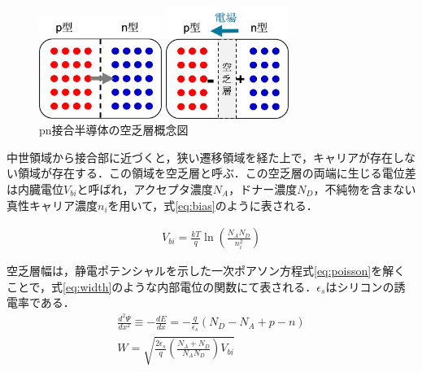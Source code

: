 \begin{figure}[h]
  \centering
  \begin{minipage}[b]{0.45\linewidth}
    \centering
    \includegraphics[width=4cm]{./figure/semiku1.png}
  \end{minipage}
  \begin{minipage}[b]{0.45\linewidth}
    \centering
    \includegraphics[width=4cm]{./figure/semiku2.png}
  \end{minipage}
  \caption{pn接合半導体の空乏層概念図}
  \label{fig:pn}
\end{figure}


中世領域から接合部に近づくと，狭い遷移領域を経た上で，キャリアが存在しない領域が存在する．この領域を空乏層と呼ぶ．この空乏層の両端に生じる電位差は内臓電位$V_{bi}$と呼ばれ，アクセプタ濃度$N_A$，ドナー濃度$N_D$，不純物を含まない真性キャリア濃度$n_i$を用いて，式\ref{eq:bias}のように表される．\par
\begin{eqnarray}
  \label{eq:bias}
  V_{bi} = \frac{kT}{q} \ln \left( \frac{N_A N_D}{n_i^2} \right) 
\end{eqnarray}

空乏層幅は，静電ポテンシャルを示した一次ポアソン方程式\ref{eq:poisson}を解くことで，式\ref{eq:width}のような内部電位の関数にて表される．$\epsilon_s$はシリコンの誘電率である．
\begin{eqnarray}
  \label{eq:poisson}
  \frac{d^2\Psi}{dx^2} \equiv -\frac{dE}{dx} = - \frac{q}{\epsilon_s}(N_D - N_A + p - n) \\
  \label{eq:width}
  W = \sqrt{ \frac{2\epsilon_s}{q} \left( \frac{N_A+N_D}{N_A N_D} \right) V_{bi}}
\end{eqnarray}

